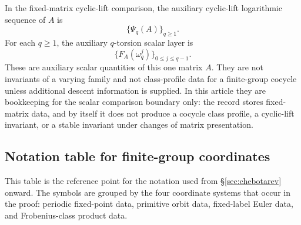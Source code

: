 \begin{definition}
  \label{def:spectral-fingerprints}
  In the fixed-matrix cyclic-lift comparison, the auxiliary cyclic-lift
  logarithmic sequence of \(A\) is
  \[
    \{\Psi_q(A)\}_{q\ge 1}.
  \]
  For each \(q\ge 1\), the auxiliary \(q\)-torsion scalar layer is
  \[
    \{F_A(\omega_q^j)\}_{0\le j\le q-1}.
  \]
  These are auxiliary scalar quantities of this one matrix \(A\). They are
  not invariants of a varying family and not class-profile data for a
  finite-group cocycle unless additional descent information is supplied. In
  this article they are bookkeeping for the scalar comparison boundary only:
  the record stores fixed-matrix data, and by itself it does not produce a
  cocycle class profile, a cyclic-lift invariant, or a stable invariant under
  changes of matrix presentation.
\end{definition}

\subsection{Notation table for finite-group coordinates}
\label{subsec:notation-table}

This table is the reference point for the notation used from
\S\ref{sec:chebotarev} onward.  The symbols are grouped by the four
coordinate systems that occur in the proof: periodic fixed-point data,
primitive orbit data, fixed-label Euler data, and Frobenius-class product
data.

